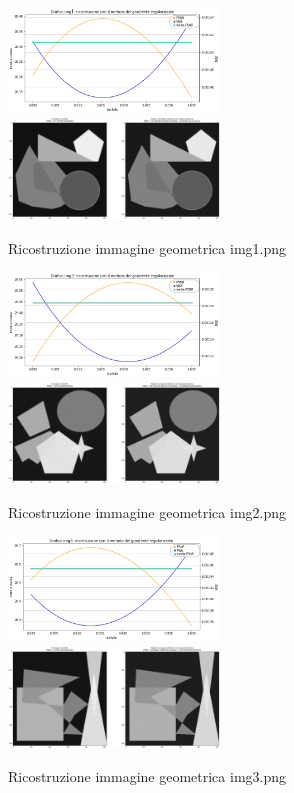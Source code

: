 \begin{figure}[H]
    \includegraphics[width=0.5\textwidth]{IMMAGINI_RELAZIONE/grafico1Tik.png}
    \includegraphics[width=0.5\textwidth]{IMMAGINI_RELAZIONE/ricostruzione1Tik.png}
    \caption{Ricostruzione immagine geometrica img1.png}

    \includegraphics[width=0.5\textwidth]{IMMAGINI_RELAZIONE/grafico2Tik.png}
    \includegraphics[width=0.5\textwidth]{IMMAGINI_RELAZIONE/ricostruzione2Tik.png}
    \caption{Ricostruzione immagine geometrica img2.png}

    \includegraphics[width=0.5\textwidth]{IMMAGINI_RELAZIONE/grafico3Tik.png}
    \includegraphics[width=0.5\textwidth]{IMMAGINI_RELAZIONE/ricostruzione3Tik.png}
    \caption{Ricostruzione immagine geometrica img3.png}
\end{figure}

